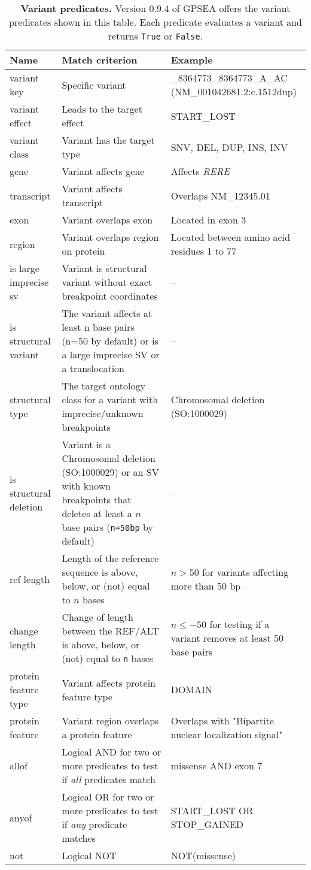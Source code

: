 \begin{table}
\centering
\renewcommand{\arraystretch}{1.2} %
\begin{tabular}{l>{\raggedright\arraybackslash}p{6cm}>{\raggedright\arraybackslash}p{6cm}}
\toprule
\textbf{Name} & \textbf{Match criterion} & \textbf{Example}\\
\midrule
variant key & Specific variant & 1\_8364773\_8364773\_A\_AC (NM\_001042681.2:c.1512dup) \\
variant effect & Leads to the target effect & START\_LOST \\
variant class & Variant has the target type & SNV, DEL, DUP, INS, INV \\
gene & Variant affects gene & Affects \textit{RERE} \\
transcript & Variant affects transcript & Overlaps NM\_12345.01 \\
exon & Variant overlaps exon & Located in exon 3 \\
region & Variant overlaps region on protein & Located between amino acid residues 1 to 77 \\
is large imprecise sv & Variant is structural variant without exact breakpoint coordinates & -- \\
is structural variant & The variant affects at least n base pairs (n=50 by default) or is a large imprecise SV or a translocation & -- \\
structural type & The target ontology class for a variant with imprecise/unknown breakpoints & Chromosomal deletion (SO:1000029) \\
is structural deletion & Variant is a Chromosomal deletion (SO:1000029) or an SV with known breakpoints that deletes at least a $n$ base pairs (\texttt{n=50bp} by default) & -- \\
ref length & Length of the reference sequence is above, below, or (not) equal to $n$ bases & $n>50$ for variants affecting more than 50 bp \\
change length & Change of length between the REF/ALT is above, below, or (not) equal to \texttt{n} bases & $n\leq-50$ for testing if a variant removes at least 50 base pairs  \\
protein feature type & Variant affects protein feature type & DOMAIN \\
protein feature & Variant region overlaps a protein feature & Overlaps with "Bipartite nuclear localization signal" \\
allof & Logical AND for two or more predicates to test if \textit{all} predicates match & missense AND exon 7 \\
anyof & Logical OR for two or more predicates to test if \textit{any} predicate matches & START\_LOST OR STOP\_GAINED \\
not & Logical NOT & NOT(missense) \\
\bottomrule
\end{tabular}
\caption{\textbf{Variant predicates.} Version 0.9.4 of GPSEA offers the variant predicates shown in this table. Each predicate evaluates a variant and returns \texttt{True} or \texttt{False}.}
\label{tab:varpredicates}
\end{table}

